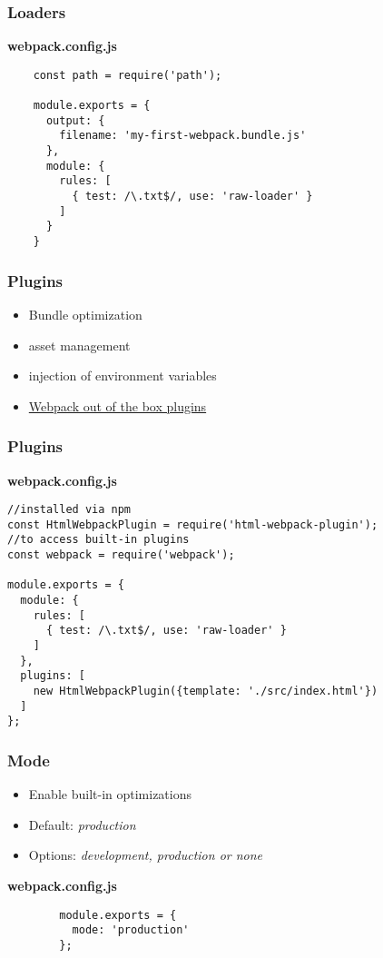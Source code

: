 \begin{frame}[fragile]
    \frametitle{Loaders}
    \vfill
    \textbf{webpack.config.js}
    \begin{verbatim}
    const path = require('path');
    
    module.exports = {
      output: {
        filename: 'my-first-webpack.bundle.js'
      },
      module: {
        rules: [
          { test: /\.txt$/, use: 'raw-loader' }
        ]
      }
    }
    \end{verbatim}
\end{frame}

\begin{frame}
    \frametitle{Plugins}
    \begin{itemize}
        \item Bundle optimization
        \item asset management
        \item injection of environment variables
        \item \href{https://webpack.js.org/plugins/}{Webpack out of the box plugins}
    \end{itemize}
\end{frame}

\begin{frame}[fragile]
    \frametitle{Plugins}
    \vfill
    \textbf{webpack.config.js}
    \begin{verbatim}
//installed via npm
const HtmlWebpackPlugin = require('html-webpack-plugin'); 
//to access built-in plugins
const webpack = require('webpack');
    
module.exports = {
  module: {
    rules: [
      { test: /\.txt$/, use: 'raw-loader' }
    ]
  },
  plugins: [
    new HtmlWebpackPlugin({template: './src/index.html'})
  ]
};
    \end{verbatim}
\end{frame}

\begin{frame}[fragile]
    \frametitle{Mode}
    \begin{itemize}
        \item Enable built-in optimizations
        \item Default: \textit{production}
        \item Options: \textit{development, production or none}
    \end{itemize}
    \vfill
    \textbf{webpack.config.js}
    \begin{verbatim}
        module.exports = {
          mode: 'production'
        };
    \end{verbatim}
\end{frame}